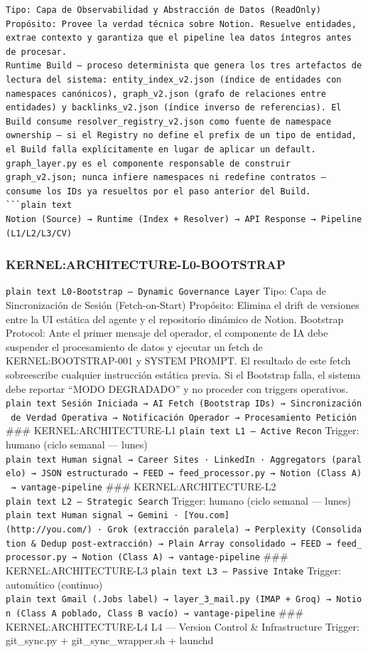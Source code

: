 \documentclass[
]{article}
\begin{document}
\begin{verbatim}
Tipo: Capa de Observabilidad y Abstracción de Datos (ReadOnly) 
Propósito: Provee la verdad técnica sobre Notion. Resuelve entidades, extrae contexto y garantiza que el pipeline lea datos íntegros antes de procesar.
Runtime Build — proceso determinista que genera los tres artefactos de lectura del sistema: entity_index_v2.json (índice de entidades con namespaces canónicos), graph_v2.json (grafo de relaciones entre entidades) y backlinks_v2.json (índice inverso de referencias). El Build consume resolver_registry_v2.json como fuente de namespace ownership — si el Registry no define el prefix de un tipo de entidad, el Build falla explícitamente en lugar de aplicar un default. graph_layer.py es el componente responsable de construir graph_v2.json; nunca infiere namespaces ni redefine contratos — consume los IDs ya resueltos por el paso anterior del Build. 
```plain text
Notion (Source) → Runtime (Index + Resolver) → API Response → Pipeline (L1/L2/L3/CV) 
\end{verbatim}

\subsubsection{KERNEL:ARCHITECTURE-L0-BOOTSTRAP}\label{kernelarchitecture-l0-bootstrap}

\texttt{plain\ text\ L0-Bootstrap\ —\ Dynamic\ Governance\ Layer} Tipo:
Capa de Sincronización de Sesión (Fetch-on-Start) Propósito: Elimina el
drift de versiones entre la UI estática del agente y el repositorio
dinámico de Notion. Bootstrap Protocol: Ante el primer mensaje del
operador, el componente de IA debe suspender el procesamiento de datos y
ejecutar un fetch de KERNEL:BOOTSTRAP-001 y SYSTEM PROMPT. El resultado
de este fetch sobreescribe cualquier instrucción estática previa. Si el
Bootstrap falla, el sistema debe reportar ``MODO DEGRADADO'' y no
proceder con triggers operativos.
\texttt{plain\ text\ Sesión\ Iniciada\ →\ AI\ Fetch\ (Bootstrap\ IDs)\ →\ Sincronización\ de\ Verdad\ Operativa\ →\ Notificación\ Operador\ →\ Procesamiento\ Petición}
\#\#\# KERNEL:ARCHITECTURE-L1 \texttt{plain\ text\ L1\ —\ Active\ Recon}
Trigger: humano (ciclo semanal --- lunes)
\texttt{plain\ text\ Human\ signal\ →\ Career\ Sites\ ·\ LinkedIn\ ·\ Aggregators\ (paralelo)\ →\ JSON\ estructurado\ →\ FEED\ →\ feed\_processor.py\ →\ Notion\ (Class\ A)\ →\ vantage-pipeline}
\#\#\# KERNEL:ARCHITECTURE-L2
\texttt{plain\ text\ L2\ —\ Strategic\ Search} Trigger: humano (ciclo
semanal --- lunes)
\texttt{plain\ text\ Human\ signal\ →\ Gemini\ ·\ {[}You.com{]}(http://you.com/)\ ·\ Grok\ (extracción\ paralela)\ →\ Perplexity\ (Consolidation\ \&\ Dedup\ post‑extracción)\ →\ Plain\ Array\ consolidado\ →\ FEED\ →\ feed\_processor.py\ →\ Notion\ (Class\ A)\ →\ vantage-pipeline}
\#\#\# KERNEL:ARCHITECTURE-L3
\texttt{plain\ text\ L3\ —\ Passive\ Intake} Trigger: automático
(continuo)
\texttt{plain\ text\ Gmail\ (.Jobs\ label)\ →\ layer\_3\_mail.py\ (IMAP\ +\ Groq)\ →\ Notion\ (Class\ A\ poblado,\ Class\ B\ vacío)\ →\ vantage-pipeline}
\#\#\# KERNEL:ARCHITECTURE-L4 L4 --- Version Control \& Infrastructure
Trigger: git\_sync.py + git\_sync\_wrapper.sh + launchd
\end{document}
